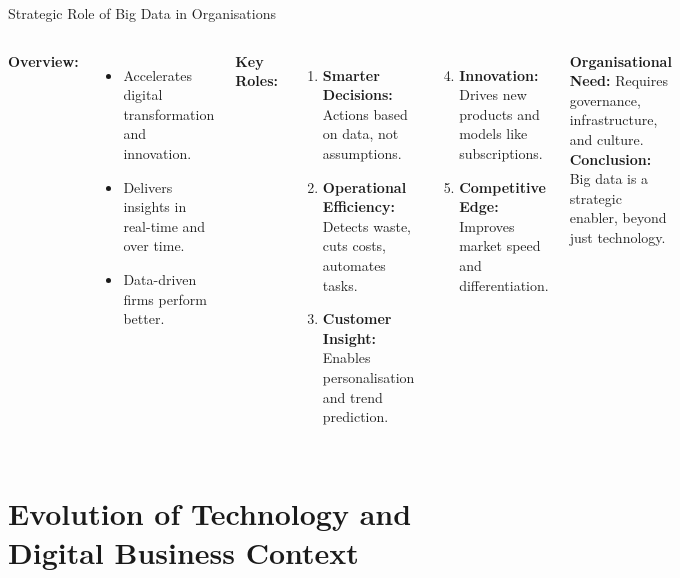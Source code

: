 \documentclass[aspectratio=169, table]{beamer}
\begin{document}
\begin{frame}[fragile]{Strategic Role of Big Data in Organisations}
	\vspace{20pt}
	\small
	\begin{columns}[T]
		\textbf{Overview:}
		\begin{itemize}
			\item Accelerates digital transformation and innovation.
			\item Delivers insights in real-time and over time.
			\item Data-driven firms perform better.
		\end{itemize}
		
		\textbf{Key Roles:}
		\begin{enumerate}
			\item \textbf{Smarter Decisions:} Actions based on data, not assumptions.
			\item \textbf{Operational Efficiency:} Detects waste, cuts costs, automates tasks.
			\item \textbf{Customer Insight:} Enables personalisation and trend prediction.
		\end{enumerate}
		
		\begin{enumerate}
			\setcounter{enumi}{3}
			\item \textbf{Innovation:} Drives new products and models like subscriptions.
			\item \textbf{Competitive Edge:} Improves market speed and differentiation.
		\end{enumerate}
		
		\textbf{Organisational Need:} Requires governance, infrastructure, and culture.  
		\textbf{Conclusion:} Big data is a strategic enabler, beyond just technology.
	\end{columns}
\end{frame}


\section{Evolution of Technology and Digital Business Context}
\end{document}
